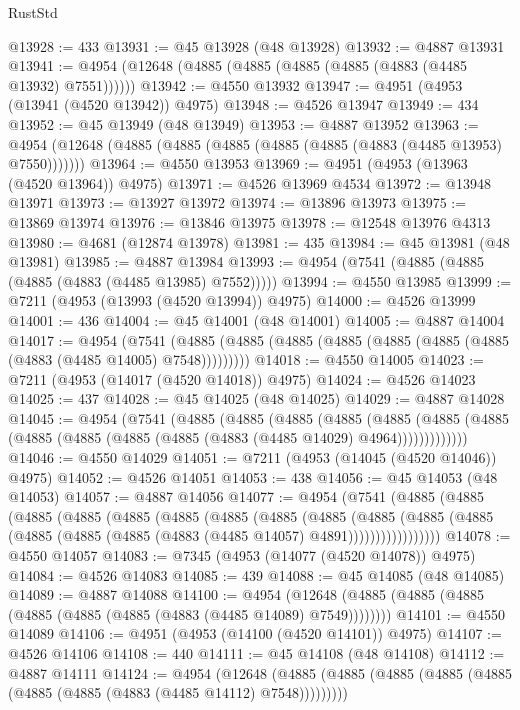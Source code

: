 \begin{lexlean}{RustStd}
\begin{coremodule}
@13928 := 433
@13931 := @45 @13928 (@48 @13928)
@13932 := @4887 @13931
@13941 := @4954 (@12648 (@4885 (@4885 (@4885 (@4885 (@4883 (@4485 @13932) @7551))))))
@13942 := @4550 @13932
@13947 := @4951 (@4953 (@13941 (@4520 @13942)) @4975)
@13948 := @4526 @13947
@13949 := 434
@13952 := @45 @13949 (@48 @13949)
@13953 := @4887 @13952
@13963 := @4954 (@12648 (@4885 (@4885 (@4885 (@4885 (@4885 (@4883 (@4485 @13953) @7550)))))))
@13964 := @4550 @13953
@13969 := @4951 (@4953 (@13963 (@4520 @13964)) @4975)
@13971 := @4526 @13969 @4534
@13972 := @13948 @13971
@13973 := @13927 @13972
@13974 := @13896 @13973
@13975 := @13869 @13974
@13976 := @13846 @13975
@13978 := @12548 @13976 @4313
@13980 := @4681 (@12874 @13978)
@13981 := 435
@13984 := @45 @13981 (@48 @13981)
@13985 := @4887 @13984
@13993 := @4954 (@7541 (@4885 (@4885 (@4885 (@4883 (@4485 @13985) @7552)))))
@13994 := @4550 @13985
@13999 := @7211 (@4953 (@13993 (@4520 @13994)) @4975)
@14000 := @4526 @13999
@14001 := 436
@14004 := @45 @14001 (@48 @14001)
@14005 := @4887 @14004
@14017 := @4954
    (@7541 (@4885 (@4885 (@4885 (@4885 (@4885 (@4885 (@4885 (@4883 (@4485 @14005) @7548)))))))))
@14018 := @4550 @14005
@14023 := @7211 (@4953 (@14017 (@4520 @14018)) @4975)
@14024 := @4526 @14023
@14025 := 437
@14028 := @45 @14025 (@48 @14025)
@14029 := @4887 @14028
@14045 := @4954
    (@7541
      (@4885
        (@4885
          (@4885
            (@4885
              (@4885
                (@4885 (@4885 (@4885 (@4885 (@4885 (@4885 (@4883 (@4485 @14029) @4964)))))))))))))
@14046 := @4550 @14029
@14051 := @7211 (@4953 (@14045 (@4520 @14046)) @4975)
@14052 := @4526 @14051
@14053 := 438
@14056 := @45 @14053 (@48 @14053)
@14057 := @4887 @14056
@14077 := @4954
    (@7541
      (@4885
        (@4885
          (@4885
            (@4885
              (@4885
                (@4885
                  (@4885
                    (@4885
                      (@4885
                        (@4885
                          (@4885
                            (@4885 (@4885 (@4885 (@4885 (@4883 (@4485 @14057) @4891)))))))))))))))))
@14078 := @4550 @14057
@14083 := @7345 (@4953 (@14077 (@4520 @14078)) @4975)
@14084 := @4526 @14083
@14085 := 439
@14088 := @45 @14085 (@48 @14085)
@14089 := @4887 @14088
@14100 := @4954
    (@12648 (@4885 (@4885 (@4885 (@4885 (@4885 (@4885 (@4883 (@4485 @14089) @7549))))))))
@14101 := @4550 @14089
@14106 := @4951 (@4953 (@14100 (@4520 @14101)) @4975)
@14107 := @4526 @14106
@14108 := 440
@14111 := @45 @14108 (@48 @14108)
@14112 := @4887 @14111
@14124 := @4954
    (@12648 (@4885 (@4885 (@4885 (@4885 (@4885 (@4885 (@4885 (@4883 (@4485 @14112) @7548)))))))))

\end{coremodule}
\end{lexlean}
